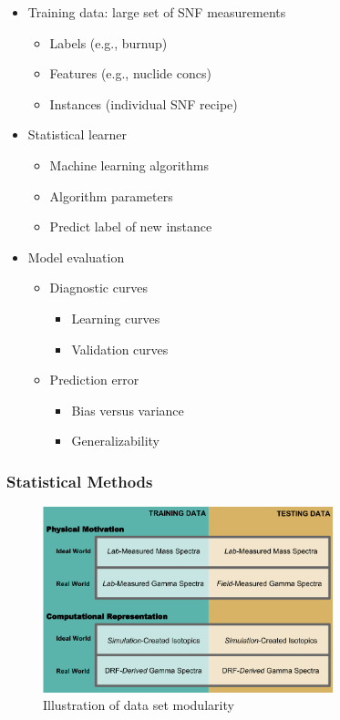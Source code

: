 \begin{frame}
\begin{minipage}{0.5\textwidth}
\begin{figure}
    \end{figure}
  \end{minipage}%
  \begin{minipage}{0.5\textwidth}
    \begin{itemize}
      \item Training data: large set of SNF measurements
      \begin{itemize}
        \item Labels (e.g., burnup)
        \item Features (e.g., nuclide concs)
        \item Instances (individual SNF recipe)
      \end{itemize}
      \item Statistical learner
      \begin{itemize}
        \item Machine learning algorithms
        \item Algorithm parameters
        \item Predict label of new instance
      \end{itemize}
      \item Model evaluation
      \begin{itemize}
        \item Diagnostic curves
        \begin{itemize}
          \item Learning curves
          \item Validation curves
        \end{itemize}
        \item Prediction error
        \begin{itemize}
          \item Bias versus variance
          \item Generalizability
        \end{itemize}
      \end{itemize}
    \end{itemize}
  \end{minipage}
\end{frame}

\begin{frame}
  \frametitle{Statistical Methods}
  \begin{figure}[h!]
    \centering
    \includegraphics[width=0.75\textwidth]{./figures/proposal.png}
    \caption{Illustration of data set modularity}
  \end{figure}
\end{frame}

